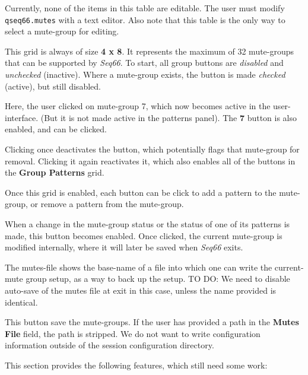    Currently, none of the items in this table are editable.
   The user must modify \texttt{qseq66.mutes} with a text editor.
   Also note that this table is the only way to select a mute-group for editing.

   This grid is always of size \textbf{4 x 8}.  It represents the maximum of 32
   mute-groups that can be supported by \textsl{Seq66}.
   To start, all group buttons are \textsl{disabled} and
   \textsl{unchecked} (inactive).
   Where a mute-group exists, the button is made \textsl{checked} (active),
   but still disabled.

   Here, the user clicked on mute-group 7, which now becomes active in the
   user-interface.  (But it is not made active in the patterns panel).
   The \textbf{7} button is also enabled, and can be clicked.

   Clicking once deactivates the button, which potentially flags that mute-group
   for removal.  Clicking it again reactivates it, which also enables all of the
   buttons in the \textbf{Group Patterns} grid.

   Once this grid is enabled, each button can be click to add a pattern to the
   mute-group, or remove a pattern from the mute-group.

   When a change in the mute-group status or the status of one of its patterns is
   made, this button becomes enabled.  Once clicked, the current mute-group is
   modified internally, where it will later be saved when \textsl{Seq66} exits.

   The mutes-file shows the base-name of a file into which one can write the
   current-mute group setup, as a way to back up the setup.
   TO DO:  We need to disable auto-save of the mutes file at exit in this case,
   unless the name provided is identical.

   This button save the mute-groups.
   If the user has provided a path in the \textbf{Mutes File} field, the path is
   stripped.  We do not want to write configuration information outside of the
   session configuration directory.

   This section provides the following features, which still need some work:

